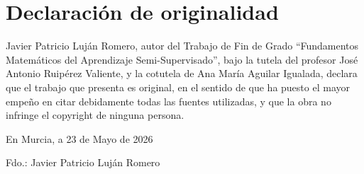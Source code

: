 \chapter*{Declaración de originalidad}

Javier Patricio Luján Romero, autor del Trabajo de Fin de Grado “Fundamentos Matemáticos del Aprendizaje Semi-Supervisado”, bajo la tutela del profesor José Antonio Ruipérez Valiente, y la cotutela de Ana María Aguilar Igualada, declara que el trabajo que presenta es original, en el sentido de que ha puesto el mayor empeño en citar debidamente todas las fuentes utilizadas, y que la obra no infringe el copyright de ninguna persona.

\begin{center}
En Murcia, a 23 de Mayo de 2026

\vspace{3cm}

Fdo.: Javier Patricio Luján Romero
\end{center}

\cleardoublepage

